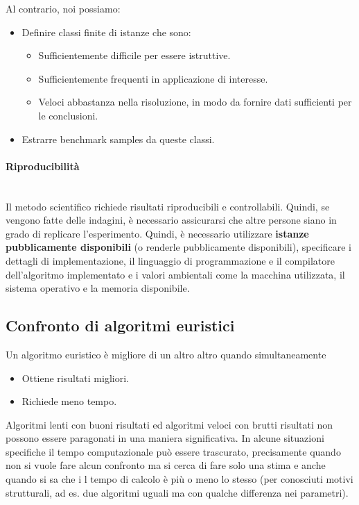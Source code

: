 \documentclass{article}
\begin{document}
Al contrario, noi possiamo:
\begin{itemize}
    \item Definire classi finite di istanze che sono:
          \begin{itemize}
              \item Sufficientemente difficile per essere istruttive.
              \item Sufficientemente frequenti in applicazione di interesse.
              \item Veloci abbastanza nella risoluzione, in modo da fornire dati sufficienti per le conclusioni.
          \end{itemize}
    \item Estrarre benchmark samples da queste classi.
\end{itemize}

\paragraph{Riproducibilità}\mbox{}\\
Il metodo scientifico richiede risultati riproducibili e controllabili. Quindi,
se vengono fatte delle indagini, è necessario assicurarsi che altre persone siano
in grado di replicare l'esperimento. Quindi, è necessario utilizzare \textbf{istanze
    pubblicamente disponibili} (o renderle pubblicamente disponibili), specificare i
dettagli di implementazione, il linguaggio di programmazione e il compilatore
dell'algoritmo implementato e i valori ambientali come la macchina utilizzata,
il sistema operativo e la memoria disponibile.

\subsection{Confronto di algoritmi euristici}
Un algoritmo euristico è migliore di un altro altro quando simultaneamente
\begin{itemize}
    \item Ottiene risultati migliori.
    \item Richiede meno tempo.
\end{itemize}
Algoritmi lenti con buoni risultati ed algoritmi veloci con brutti risultati
non possono essere paragonati in una maniera significativa. In alcune situazioni
specifiche il tempo computazionale può essere trascurato, precisamente quando
non si vuole fare alcun confronto ma si cerca di fare solo una stima e anche
quando si sa che i l tempo di calcolo è più o meno lo stesso (per conosciuti
motivi strutturali, ad es. due algoritmi uguali ma con qualche differenza nei
parametri).
\end{document}
